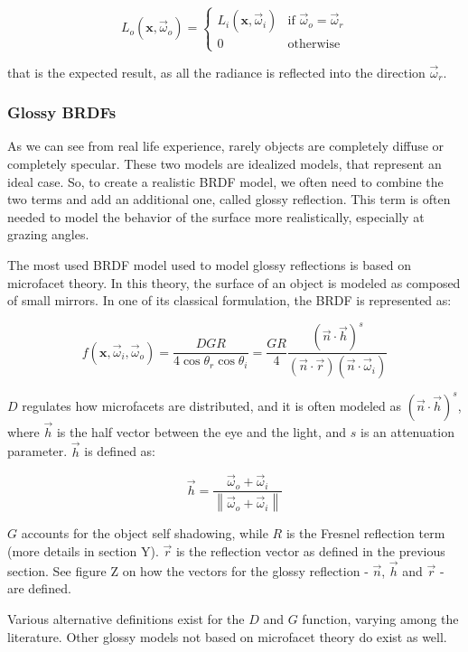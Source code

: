 \begin{equation*}
L_o(\mathbf{x}, \vec{\omega}_o) = \begin{cases}
L_i(\mathbf{x}, \vec{\omega}_i)  &\text{if $\vec{\omega}_o = \vec{\omega}_r$}\\
0 &\text{otherwise}
\end{cases}
\end{equation*}

that is the expected result, as all the radiance is reflected into the direction $\vec{\omega}_r$.

\subsubsection{Glossy BRDFs}

As we can see from real life experience, rarely objects are completely diffuse or completely specular. These two models are idealized models, that represent an ideal case. So, to create a realistic BRDF model, we often need to combine the two terms and add an additional one, called glossy reflection. This term is often needed to model the behavior of the surface more realistically, especially at grazing angles.

The most used BRDF model used to model glossy reflections is based on microfacet theory. In this theory, the surface of an object is modeled as composed of small mirrors. In one of its classical formulation, the BRDF is represented as:

$$
f(\mathbf{x}, \vec{\omega}_i, \vec{\omega}_o) = \frac{D G R}{4 \cos\theta_r \cos\theta_i} = \frac{G R}{4} \frac{(\vec{n}\cdot\vec{h})^s}{(\vec{n}\cdot\vec{r})(\vec{n}\cdot\vec{\omega}_i)}
$$

$D$ regulates how microfacets are distributed, and it is often modeled as $(\vec{n}\cdot\vec{h})^s$, where $\vec{h}$ is the half vector between the eye and the light, and $s$ is an attenuation parameter. $\vec{h}$ is defined as:

$$
\vec{h} = \frac{\vec{\omega}_o + \vec{\omega}_i}{\left\| \vec{\omega}_o + \vec{\omega}_i \right\|}
$$

$G$ accounts for the object self shadowing, while $R$ is the Fresnel reflection term (more details in section Y).	$\vec{r}$ is the reflection vector as defined in the previous section. See figure Z on how the vectors for the glossy reflection - $\vec{n}$, $\vec{h}$ and $\vec{r}$ - are defined.

Various alternative definitions exist for the $D$ and $G$ function, varying among the literature. Other glossy models not based on microfacet theory do exist as well. 

